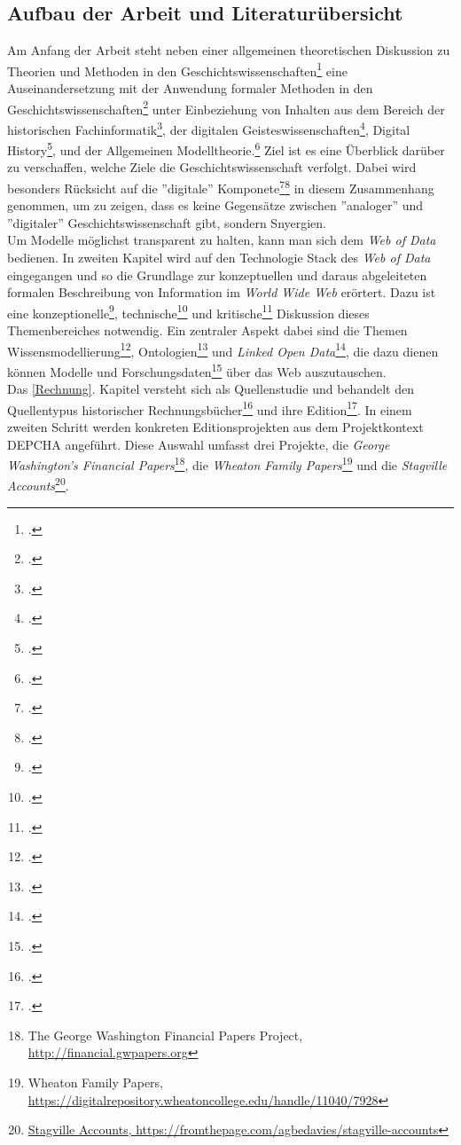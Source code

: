 \documentclass[12pt,a4paper]{article}
\begin{document}
\subsection{Aufbau der Arbeit und Literaturübersicht}
Am Anfang der Arbeit steht neben einer allgemeinen theoretischen Diskussion zu Theorien und Methoden in den Geschichtswissenschaften\footcite{jordan2018theorien} eine Auseinandersetzung mit der Anwendung formaler Methoden in den Geschichtswissenschaften\footcite{thaller2017ungefahre} unter Einbeziehung von Inhalten aus dem Bereich der historischen Fachinformatik\footcite{thaller2017historical}, der digitalen Geisteswissenschaften\footcite{jannidis2017digital}, Digital History\footcite{graham2015exploring},  und der Allgemeinen Modelltheorie.\footcite{stachowiak1973allgemeine} Ziel ist es eine Überblick darüber zu verschaffen, welche Ziele die Geschichtswissenschaft verfolgt. Dabei wird besonders Rücksicht auf die ''digitale'' Komponete\footcite{fohr2017historische}\footcite{wintergrun2019netzwerkanalysen} in diesem Zusammenhang genommen, um zu zeigen, dass es keine Gegensätze zwischen ''analoger'' und ''digitaler'' Geschichtswissenschaft gibt, sondern Snyergien.
\\
Um Modelle möglichst transparent zu halten, kann man sich dem \textit{Web of Data} bedienen. In zweiten Kapitel wird auf den Technologie Stack des \textit{Web of Data} eingegangen und so die Grundlage zur konzeptuellen und daraus abgeleiteten formalen Beschreibung von Information im \textit{World Wide Web} erörtert. Dazu ist eine konzeptionelle\footcite{berners2001semantic}, technische\footcite{bernstein2016new} und kritische\footcite{swartz2013aaron} Diskussion dieses Themenbereiches notwendig. Ein zentraler Aspekt dabei sind die Themen Wissensmodellierung\footcite{kelly2016practical}, Ontologien\footcite{stuckenschmidt2009ontologien} und \textit{Linked Open Data}\footcite{bauer2011linked}, die dazu dienen können Modelle und Forschungsdaten\footcite{neher2011semantische} über das Web auszutauschen.
\\
Das \ref{Rechnung}. Kapitel versteht sich als Quellenstudie und behandelt den Quellentypus historischer Rechnungsbücher\footcite{gleba2015wirtschafts} und ihre Edition\footcite{vogeler2015mittelalterliche}. In einem zweiten Schritt werden konkreten Editionsprojekten aus dem Projektkontext DEPCHA  angeführt. Diese Auswahl umfasst drei Projekte, die \textit{George Washington’s Financial Papers}\footnote{The George Washington Financial Papers Project, \url{http://financial.gwpapers.org}}, die \textit{Wheaton Family Papers}\footnote{Wheaton Family Papers, \url{https://digitalrepository.wheatoncollege.edu/handle/11040/7928}} und die \textit{Stagville Accounts}\footnote{\url{Stagville Accounts, https://fromthepage.com/agbedavies/stagville-accounts}}.
\end{document}
